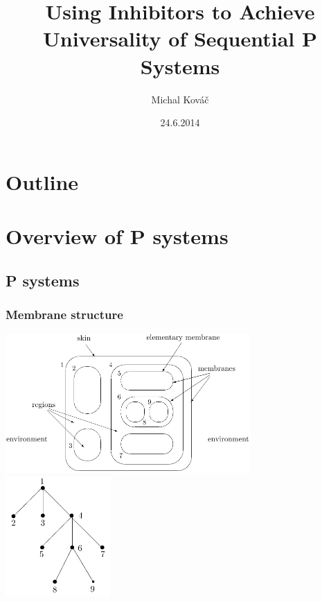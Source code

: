 \usepackage[utf8]{inputenc}
\usepackage{slovak}
\usepackage{tikz}
\usetikzlibrary{arrows,positioning}

\title{Using Inhibitors to Achieve Universality of Sequential P Systems}
\author{Michal Kováč}
\date{24.6.2014}


\begin{frame}[t]
\titlepage
\end{frame}
\note{}

\section*{Outline}
\begin{frame}
\tableofcontents
\end{frame}
\note{}

\section{Overview of P systems} %
\label{sec:overview_of_p_systems}

  \subsection{P systems} %
  \label{sub:p_systems}

    \begin{frame}[t]\frametitle{Membrane structure}
      \includegraphics[width=0.7\textwidth]{membrane_structure.png}
      \hfill
      \includegraphics[width=0.3\textwidth]{membrane_tree.png}

    \end{frame}
    \note{}

